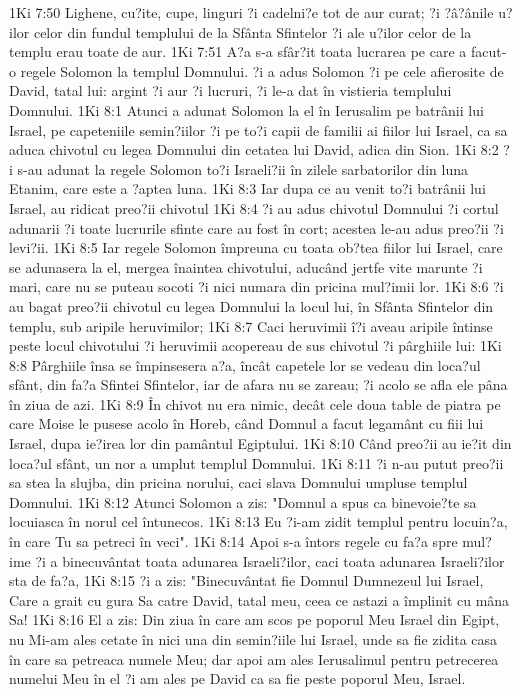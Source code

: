 1Ki 7:50  Lighene, cu?ite, cupe, linguri ?i cadelni?e tot de aur curat; ?i ?â?ânile u?ilor celor din fundul templului de la Sfânta Sfintelor ?i ale u?ilor celor de la templu erau toate de aur.
1Ki 7:51  A?a s-a sfâr?it toata lucrarea pe care a facut-o regele Solomon la templul Domnului. ?i a adus Solomon ?i pe cele afierosite de David, tatal lui: argint ?i aur ?i lucruri, ?i le-a dat în vistieria templului Domnului.
1Ki 8:1  Atunci a adunat Solomon la el în Ierusalim pe batrânii lui Israel, pe capeteniile semin?iilor ?i pe to?i capii de familii ai fiilor lui Israel, ca sa aduca chivotul cu legea Domnului din cetatea lui David, adica din Sion.
1Ki 8:2  ?i s-au adunat la regele Solomon to?i Israeli?ii în zilele sarbatorilor din luna Etanim, care este a ?aptea luna.
1Ki 8:3  Iar dupa ce au venit to?i batrânii lui Israel, au ridicat preo?ii chivotul
1Ki 8:4  ?i au adus chivotul Domnului ?i cortul adunarii ?i toate lucrurile sfinte care au fost în cort; acestea le-au adus preo?ii ?i levi?ii.
1Ki 8:5  Iar regele Solomon împreuna cu toata ob?tea fiilor lui Israel, care se adunasera la el, mergea înaintea chivotului, aducând jertfe vite marunte ?i mari, care nu se puteau socoti ?i nici numara din pricina mul?imii lor.
1Ki 8:6  ?i au bagat preo?ii chivotul cu legea Domnului la locul lui, în Sfânta Sfintelor din templu, sub aripile heruvimilor;
1Ki 8:7  Caci heruvimii î?i aveau aripile întinse peste locul chivotului ?i heruvimii acopereau de sus chivotul ?i pârghiile lui:
1Ki 8:8  Pârghiile însa se împinsesera a?a, încât capetele lor se vedeau din loca?ul sfânt, din fa?a Sfintei Sfintelor, iar de afara nu se zareau; ?i acolo se afla ele pâna în ziua de azi.
1Ki 8:9  În chivot nu era nimic, decât cele doua table de piatra pe care Moise le pusese acolo în Horeb, când Domnul a facut legamânt cu fiii lui Israel, dupa ie?irea lor din pamântul Egiptului.
1Ki 8:10  Când preo?ii au ie?it din loca?ul sfânt, un nor a umplut templul Domnului.
1Ki 8:11  ?i n-au putut preo?ii sa stea la slujba, din pricina norului, caci slava Domnului umpluse templul Domnului.
1Ki 8:12  Atunci Solomon a zis: "Domnul a spus ca binevoie?te sa locuiasca în norul cel întunecos.
1Ki 8:13  Eu ?i-am zidit templul pentru locuin?a, în care Tu sa petreci în veci".
1Ki 8:14  Apoi s-a întors regele cu fa?a spre mul?ime ?i a binecuvântat toata adunarea Israeli?ilor, caci toata adunarea Israeli?ilor sta de fa?a,
1Ki 8:15  ?i a zis: "Binecuvântat fie Domnul Dumnezeul lui Israel, Care a grait cu gura Sa catre David, tatal meu, ceea ce astazi a împlinit cu mâna Sa!
1Ki 8:16  El a zis: Din ziua în care am scos pe poporul Meu Israel din Egipt, nu Mi-am ales cetate în nici una din semin?iile lui Israel, unde sa fie zidita casa în care sa petreaca numele Meu; dar apoi am ales Ierusalimul pentru petrecerea numelui Meu în el ?i am ales pe David ca sa fie peste poporul Meu, Israel.
